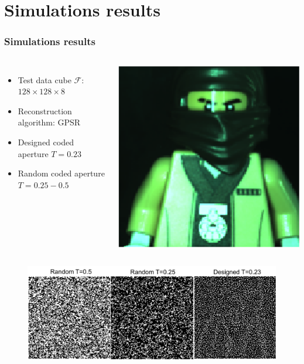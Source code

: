 \documentclass{beamer}
\begin{document}
\section{Simulations results}
\begin{frame}
\frametitle{Simulations results}

\begin{columns}
\column{3.5in}
\begin{itemize}
\item Test data cube $\mathcal{F}$: $128 \times 128 \times 8$ 
\item Reconstruction algorithm: GPSR
\item Designed coded aperture $T= 0.23$
\item Random coded aperture $T= 0.25 - 0.5$
\end{itemize}

\column{2in}
\includegraphics[scale=0.38]{FiguresUpd/sim_rgb.png}

\end{columns}

\begin{figure}
\includegraphics[scale=0.4]{FiguresUpd/codes.png}
\end{figure}
\end{frame}
\end{document}
